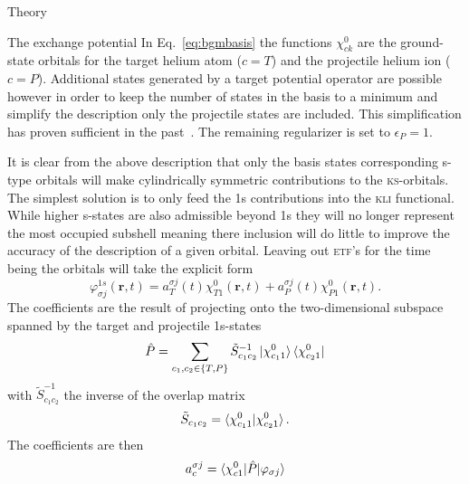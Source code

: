 \documentclass[aps, pra, reprint, groupedaddress, amsfonts,
               amsmath, amssymb, showpacs, nofootinbib]{revtex4-1}
\begin{document}
\begin{section}{Theory \label{sec:theory}}
\begin{subsection}{The exchange potential \label{sec:xpot}}
      In Eq.~\eqref{eq:bgmbasis} the functions $\chi^{0}_{ck}$ are the ground-state orbitals for the
      target helium atom ($c = T$) and the projectile helium ion ($c = P$). Additional states generated
      by a target potential operator are possible however in order to keep the number of states in the
      basis to a minimum and simplify the description only the projectile states are included. This
      simplification has proven sufficient in the past~\cite{bgm-rev}. The remaining regularizer is set
      to $\epsilon_P = 1$.

      It is clear from the above description that only the basis states corresponding s-type orbitals
      will make cylindrically symmetric contributions to the \textsc{ks}-orbitals. The simplest solution
      is to only feed the 1s contributions into the \textsc{kli} functional. While higher s-states are
      also admissible beyond 1s they will no longer represent the most occupied subshell meaning there
      inclusion will do little to improve the accuracy of the description of a given orbital. Leaving
      out \textsc{etf}'s for the time being the orbitals will take the explicit form
      \begin{equation} \label{eq:1sonly}
         \varphi_{\sigma j}^{1s}(\mathbf{r},t) = a^{\sigma j}_T(t) \chi^{0}_{T1}(\mathbf{r},t)
                                               + a^{\sigma j}_P(t) \chi^{0}_{P1}(\mathbf{r},t).
      \end{equation}
      The coefficients are the result of projecting onto the two-dimensional subspace spanned by the
      target and projectile 1s-states
      \begin{equation} \label{eq:proj}
         \hat{P} = \sum\limits_{c_1, c_2 \in \{T,P\}} \tilde{S}^{-1}_{c_1 c_2}
                                                      \ket{\chi^{0}_{c_1 1}}
                                                      \bra{\chi^{0}_{c_2 1}}
      \end{equation}
      with $\tilde{S}^{-1}_{c_1 c_2}$ the inverse of the overlap matrix
      \begin{equation} \label{eq:overlap2d}
         \tilde{S}_{c_1 c_2} = \braket{ \chi^{0}_{c_1 1} | \chi^{0}_{c_2 1} }.
      \end{equation}
      The coefficients are then
      \begin{equation} \label{eq:coef}
         \begin{split}
            a^{\sigma j}_c & = \braket{ \chi^{0}_{c 1} | \hat{P} | \varphi_{\sigma j} } \\

\end{split}
\end{equation}
\end{subsection}
\end{section}
\end{document}
